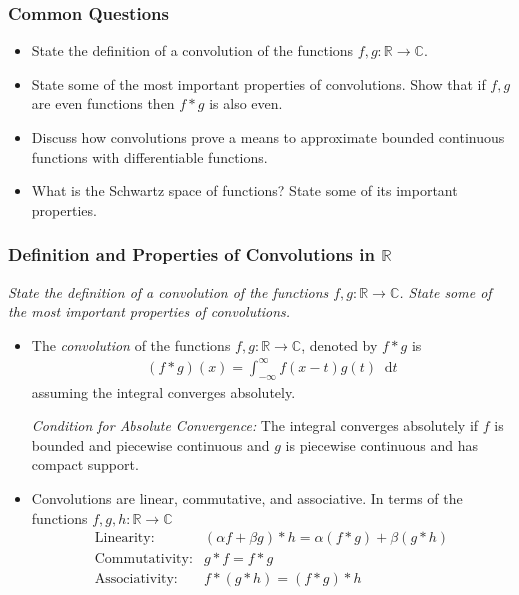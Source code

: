 \documentclass[11pt, a4paper]{article}
\newcommand{\question}[1]{\textit{#1}\vspace{2mm}}
\newcommand{\R}{\mathbb{R}} %
\newcommand{\C}{\mathbb{C}} %
\newcommand{\diff}{\mathop{}\!\mathrm{d}} %
\begin{document}
\subsubsection{Common Questions}
\begin{itemize}
	\item State the definition of a convolution of the functions $ f, g: \R \to \C $.
	
	\item State some of the most important properties of convolutions. Show that if $ f, g $ are even functions then $ f*g $ is also even.
	
	\item Discuss how convolutions prove a means to approximate bounded continuous functions with differentiable functions. 
	
	\item What is the Schwartz space of functions? State some of its important properties.
\end{itemize}

\subsubsection{Definition and Properties of Convolutions in $ \R $}
\question{State the definition of a convolution of the functions $ f, g: \R \to \C $. State some of the most important properties of convolutions.}

\begin{itemize}
	\item The \textit{convolution} of the functions $ f, g: \R \to \C $, denoted by $ f * g $ is
	\begin{align*}
		(f*g)(x) = \int_{-\infty}^{\infty}f(x-t)g(t)\diff t
	\end{align*}
	assuming the integral converges absolutely. 
	
	\textit{Condition for Absolute Convergence:} The integral converges absolutely if $ f $ is bounded and piecewise continuous and $ g $ is piecewise continuous and has compact support. 
	
	\item Convolutions are linear, commutative, and associative. In terms of the functions $ f, g, h: \R \to \C $	
	\[
		\begin{array}{ll}
		 	\text{Linearity:} & (\alpha f + \beta g)*h =  \alpha (f*g) + \beta (g*h) \\
		 	\text{Commutativity:} & g*f = f*g \\
		 	\text{Associativity:} & f*(g*h) = (f*g)*h 
		\end{array}
	\]
	
\end{itemize}
\end{document}
